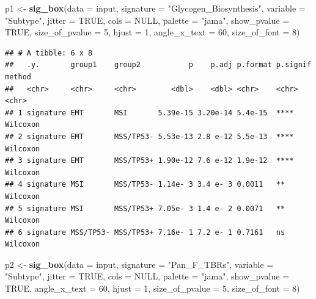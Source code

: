 \documentclass[
  12pt,
]{book}
\newenvironment{Shaded}{\begin{snugshade}}{\end{snugshade}}
\newcommand{\AttributeTok}[1]{\textcolor[rgb]{0.13,0.29,0.53}{#1}}
\newcommand{\ConstantTok}[1]{\textcolor[rgb]{0.56,0.35,0.01}{#1}}
\newcommand{\DecValTok}[1]{\textcolor[rgb]{0.00,0.00,0.81}{#1}}
\newcommand{\FunctionTok}[1]{\textcolor[rgb]{0.13,0.29,0.53}{\textbf{#1}}}
\newcommand{\NormalTok}[1]{#1}
\newcommand{\OtherTok}[1]{\textcolor[rgb]{0.56,0.35,0.01}{#1}}
\newcommand{\StringTok}[1]{\textcolor[rgb]{0.31,0.60,0.02}{#1}}
\theoremstyle{definition}
\theoremstyle{definition}
\theoremstyle{definition}
\theoremstyle{definition}
\theoremstyle{remark}
\begin{document}
\begin{Shaded}
\begin{Highlighting}[]
\NormalTok{p1 }\OtherTok{\textless{}{-}} \FunctionTok{sig\_box}\NormalTok{(}\AttributeTok{data           =}\NormalTok{ input, }
              \AttributeTok{signature      =} \StringTok{"Glycogen\_Biosynthesis"}\NormalTok{,}
              \AttributeTok{variable       =} \StringTok{"Subtype"}\NormalTok{,}
              \AttributeTok{jitter          =} \ConstantTok{TRUE}\NormalTok{,}
              \AttributeTok{cols           =} \ConstantTok{NULL}\NormalTok{,}
              \AttributeTok{palette        =} \StringTok{"jama"}\NormalTok{,}
              \AttributeTok{show\_pvalue    =} \ConstantTok{TRUE}\NormalTok{,}
              \AttributeTok{size\_of\_pvalue =} \DecValTok{5}\NormalTok{,}
              \AttributeTok{hjust          =} \DecValTok{1}\NormalTok{, }
              \AttributeTok{angle\_x\_text   =} \DecValTok{60}\NormalTok{, }
              \AttributeTok{size\_of\_font   =} \DecValTok{8}\NormalTok{)}
\end{Highlighting}
\end{Shaded}

\begin{verbatim}
## # A tibble: 6 x 8
##   .y.       group1    group2           p    p.adj p.format p.signif method  
##   <chr>     <chr>     <chr>        <dbl>    <dbl> <chr>    <chr>    <chr>   
## 1 signature EMT       MSI       5.39e-15 3.20e-14 5.4e-15  ****     Wilcoxon
## 2 signature EMT       MSS/TP53- 5.53e-13 2.8 e-12 5.5e-13  ****     Wilcoxon
## 3 signature EMT       MSS/TP53+ 1.90e-12 7.6 e-12 1.9e-12  ****     Wilcoxon
## 4 signature MSI       MSS/TP53- 1.14e- 3 3.4 e- 3 0.0011   **       Wilcoxon
## 5 signature MSI       MSS/TP53+ 7.05e- 3 1.4 e- 2 0.0071   **       Wilcoxon
## 6 signature MSS/TP53- MSS/TP53+ 7.16e- 1 7.2 e- 1 0.7161   ns       Wilcoxon
\end{verbatim}

\begin{Shaded}
\begin{Highlighting}[]
\NormalTok{p2 }\OtherTok{\textless{}{-}} \FunctionTok{sig\_box}\NormalTok{(}\AttributeTok{data           =}\NormalTok{ input, }
              \AttributeTok{signature      =} \StringTok{"Pan\_F\_TBRs"}\NormalTok{,}
              \AttributeTok{variable       =} \StringTok{"Subtype"}\NormalTok{,}
              \AttributeTok{jitter          =} \ConstantTok{TRUE}\NormalTok{,}
              \AttributeTok{cols           =} \ConstantTok{NULL}\NormalTok{,}
              \AttributeTok{palette        =} \StringTok{"jama"}\NormalTok{,}
              \AttributeTok{show\_pvalue    =} \ConstantTok{TRUE}\NormalTok{,}
              \AttributeTok{angle\_x\_text   =} \DecValTok{60}\NormalTok{, }
              \AttributeTok{hjust          =} \DecValTok{1}\NormalTok{, }
              \AttributeTok{size\_of\_pvalue =} \DecValTok{5}\NormalTok{, }
              \AttributeTok{size\_of\_font   =} \DecValTok{8}\NormalTok{)}
\end{Highlighting}
\end{Shaded}
\end{document}
